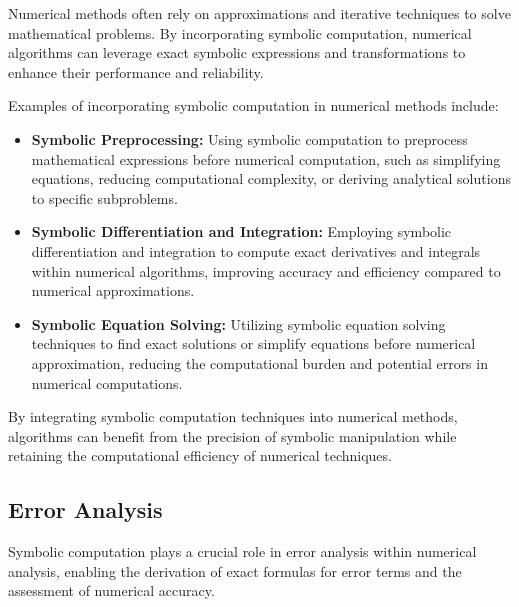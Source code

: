 Numerical methods often rely on approximations and iterative techniques to solve mathematical problems. By incorporating symbolic computation, numerical algorithms can leverage exact symbolic expressions and transformations to enhance their performance and reliability.

Examples of incorporating symbolic computation in numerical methods include:
%
\begin{itemize}
  \setlength{\itemsep}{0.0em}
  \item \textbf{Symbolic Preprocessing:} Using symbolic computation to preprocess mathematical expressions before numerical computation, such as simplifying equations, reducing computational complexity, or deriving analytical solutions to specific subproblems.
  \item \textbf{Symbolic Differentiation and Integration:} Employing symbolic differentiation and integration to compute exact derivatives and integrals within numerical algorithms, improving accuracy and efficiency compared to numerical approximations.
  \item \textbf{Symbolic Equation Solving:} Utilizing symbolic equation solving techniques to find exact solutions or simplify equations before numerical approximation, reducing the computational burden and potential errors in numerical computations.
\end{itemize}

By integrating symbolic computation techniques into numerical methods, algorithms can benefit from the precision of symbolic manipulation while retaining the computational efficiency of numerical techniques.

\subsection{Error Analysis}

Symbolic computation plays a crucial role in error analysis within numerical analysis, enabling the derivation of exact formulas for error terms and the assessment of numerical accuracy.

